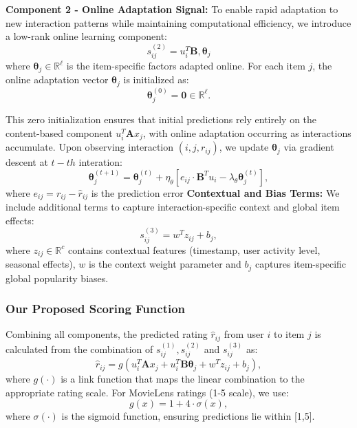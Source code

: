 \documentclass[acmsmall]{acmart}
\begin{document}
\textbf{Component 2 - Online Adaptation Signal:} To enable rapid adaptation to new interaction patterns while maintaining computational efficiency, we introduce a low-rank online learning component:
\begin{equation}
s^{(2)}_{ij} = u_i^T \mathbf{B},\boldsymbol{\theta}_j
\label{eq:online_component}
\end{equation}
where $\boldsymbol{\theta}_j \in \mathbb{R}^\ell$ is the item-specific factors adapted online. For each item $j$, the online adaptation vector $\boldsymbol{\theta}_j$ is initialized as:
\begin{equation}
\boldsymbol{\theta}_j^{(0)} = \mathbf{0} \in \mathbb{R}^\ell.
\label{eq:theta_initialization}
\end{equation}

This zero initialization ensures that initial predictions rely entirely on the content-based component $u_i^T \mathbf{A} x_j$, with online adaptation occurring as interactions accumulate. Upon observing interaction $(i,j,r_{ij})$, we update $\boldsymbol{\theta}_j$ via gradient descent at $t-th$ interation:
\begin{equation}
\boldsymbol{\theta}_j^{(t+1)} = \boldsymbol{\theta}_j^{(t)} + \eta_\theta \left[e_{ij} \cdot \mathbf{B}^T u_i - \lambda_\theta \boldsymbol{\theta}_j^{(t)}\right],
\label{eq:theta_update}
\end{equation}
where $e_{ij} = r_{ij} - \hat{r}_{ij}$ is the prediction error
\textbf{Contextual and Bias Terms:} We include additional terms to capture interaction-specific context and global item effects:
\begin{equation}
s^{(3)}_{ij} = w^T z_{ij} + b_j,
\label{eq:context_bias}
\end{equation}
where $z_{ij} \in \mathbb{R}^c$ contains contextual features (timestamp, user activity level, seasonal effects), $w$ is the context weight parameter and $b_j$ captures item-specific global popularity biases.

\subsubsection{Our Proposed Scoring Function}

Combining all components, the predicted rating $\hat{r}_{ij}$ from user $i$ to item $j$ is calculated from the combination of $s^{(1)}_{ij}, s^{(2)}_{ij}$  and $s^{(3)}_{ij}$ as: 
\begin{equation}
\hat{r}_{ij} = g\left(u_i^T \mathbf{A} x_j + u_i^T \mathbf{B} \boldsymbol{\theta}_j + w^T z_{ij} + b_j\right),
\label{eq:complete_scoring}
\end{equation}
where $g(\cdot)$ is a link function that maps the linear combination to the appropriate rating scale. For MovieLens ratings (1-5 scale), we use:
\begin{equation}
g(x) = 1 + 4 \cdot \sigma(x),
\label{eq:link_function}
\end{equation}
where $\sigma(\cdot)$ is the sigmoid function, ensuring predictions lie within [1,5].
\end{document}
